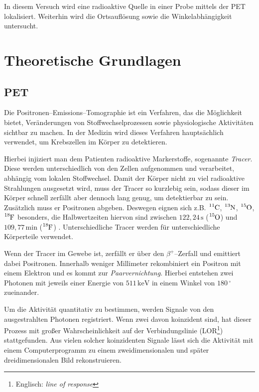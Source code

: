 \documentclass[12pt,a4paper]{scrartcl}
\numberwithin{equation}{section} %
\newcommand{\pu}[1]{\ensuremath{\mathrm{#1}}}
\begin{document}
In diesem Versuch wird eine radioaktive Quelle in einer Probe mittels der PET lokalisiert. Weiterhin wird die Ortsauflösung sowie die Winkelabhängigkeit untersucht.

\clearpage
\hypertarget{theoretische-grundlagen}{%
\section{Theoretische Grundlagen}\label{theoretische-grundlagen}}

\hypertarget{pet}{%
\subsection{PET}\label{pet}}
Die Positronen--Emissions--Tomographie ist ein Verfahren, das die Möglichkeit bietet, Veränderungen von Stoffwechselprozessen sowie physiologische Aktivitäten sichtbar zu machen. In der Medizin wird dieses Verfahren hauptsächlich verwendet, um Krebszellen im Körper zu detektieren.

Hierbei injiziert man dem Patienten radioaktive Markerstoffe, sogenannte \emph{Tracer}. Diese werden unterschiedlich von den Zellen aufgenommen und verarbeitet, abhängig vom lokalen Stoffwechsel. Damit der Körper nicht zu viel radioaktive Strahlungen ausgesetzt wird, muss der Tracer so kurzlebig sein, sodass dieser im Körper schnell zerfällt aber dennoch lang genug, um detektierbar zu sein. Zusätzlich muss er Positronen abgeben. Deswegen eignen sich z.B. $\ce{^{11}C}$, $\ce{^{13}N}$, $\ce{^{15}O}$, $\ce{^{18}F}$ besonders, die Halbwertzeiten hiervon sind zwischen $122,24 \,\mathrm s$ ($\ce{^{15}O}$) und $109,77\,\mathrm{min}$ ($\ce{^{18}F}$) \cite{NuclideChart}. Unterschiedliche Tracer werden für unterschiedliche Körperteile verwendet.

Wenn der Tracer im Gewebe ist, zerfällt er über den $\beta^+$--Zerfall und emittiert dabei Positronen. Innerhalb weniger Millimeter rekombiniert ein Positron mit einem Elektron und es kommt zur \emph{Paarvernichtung}. Hierbei entstehen zwei Photonen mit jeweils einer Energie von $\pu{511 \,keV}$ in einem Winkel von $180\,^\circ$ zueinander. \cite{Bethge,DGNM,Annihilation}

Um die Aktivität quantitativ zu bestimmen, werden Signale von den ausgestrahlten Photonen registriert. Wenn zwei davon koinzident sind, hat dieser Prozess mit großer Wahrscheinlichkeit auf der Verbindungslinie (LOR\footnote{Englisch: \emph{line of response}}) stattgefunden. Aus vielen solcher koinzidenten Signale lässt sich die Aktivität mit einem Computerprogramm zu einem zweidimensionalen und später dreidimensionalen Bild rekonstruieren.
\end{document}
